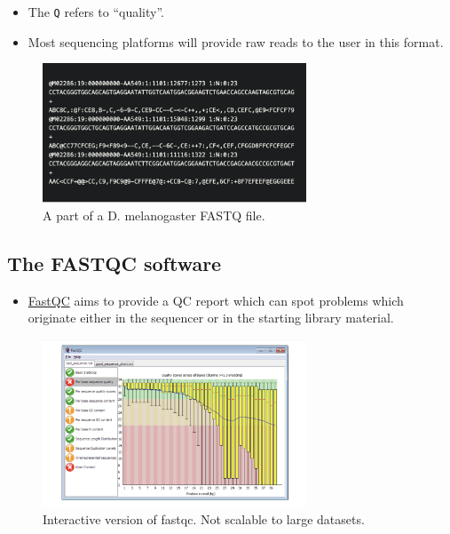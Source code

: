 \documentclass[
]{article}
\providecommand{\tightlist}{%
  \setlength{\itemsep}{0pt}\setlength{\parskip}{0pt}}
\begin{document}
\begin{itemize}
\item
  The \texttt{Q} refers to ``quality''.
\item
  Most sequencing platforms will provide raw reads to the user in this
  format.
\end{itemize}

\begin{figure}
\centering
\includegraphics[width=0.7\textwidth,height=\textheight]{images/fastqfile.png}
\caption{A part of a D. melanogaster FASTQ file.}
\end{figure}

\hypertarget{the-fastqc-software}{%
\subsection{The FASTQC software}\label{the-fastqc-software}}

\begin{itemize}
\tightlist
\item
  \href{https://www.bioinformatics.babraham.ac.uk/projects/fastqc/}{FastQC}
  aims to provide a QC report which can spot problems which originate
  either in the sequencer or in the starting library material.
\end{itemize}

\begin{figure}
\centering
\includegraphics[width=0.7\textwidth,height=\textheight]{images/fastqc.png}
\caption{Interactive version of fastqc. Not scalable to large datasets.}
\end{figure}
\end{document}
